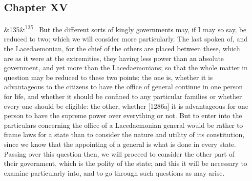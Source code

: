 \documentclass[12pt]{article}
\newcommand{\para}[1][]{\par\noindent\ifx&#1&\else\textsuperscript{\footnotesize #1}~\fi}
\begin{document}
\subsection*{Chapter XV}

\para[135] But the different sorts of kingly governments may, if I may so say, be reduced to two; which we will consider more particularly. The last spoken of, and the Lacedaemonian, for the chief of the others are placed between these, which are as it were at the extremities, they having less power than an absolute government, and yet more than the Lacedaemonians; so that the whole matter in question may be reduced to these two points; the one is, whether it is advantageous to the citizens to have the office of general continue in one person for life, and whether it should be confined to any particular families or whether every one should be eligible: the other, whether [1286a] it is advantageous for one person to have the supreme power over everything or not. But to enter into the particulars concerning the office of a Lacedaemonian general would be rather to frame laws for a state than to consider the nature and utility of its constitution, since we know that the appointing of a general is what is done in every state. Passing over this question then, we will proceed to consider the other part of their government, which is the polity of the state; and this it will be necessary to examine particularly into, and to go through such questions as may arise.
\end{document}
